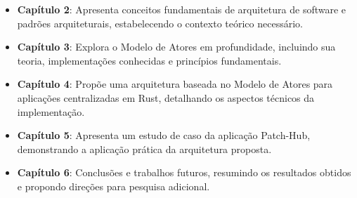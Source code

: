 \begin{itemize}
    \item \textbf{Capítulo 2}: Apresenta conceitos fundamentais de arquitetura de software e padrões arquiteturais, estabelecendo o contexto teórico necessário.
    
    \item \textbf{Capítulo 3}: Explora o Modelo de Atores em profundidade, incluindo sua teoria, implementações conhecidas e princípios fundamentais.
    
    \item \textbf{Capítulo 4}: Propõe uma arquitetura baseada no Modelo de Atores para aplicações centralizadas em Rust, detalhando os aspectos técnicos da implementação.
    
    \item \textbf{Capítulo 5}: Apresenta um estudo de caso da aplicação Patch-Hub, demonstrando a aplicação prática da arquitetura proposta.
    
    \item \textbf{Capítulo 6}: Conclusões e trabalhos futuros, resumindo os resultados obtidos e propondo direções para pesquisa adicional.
\end{itemize}

